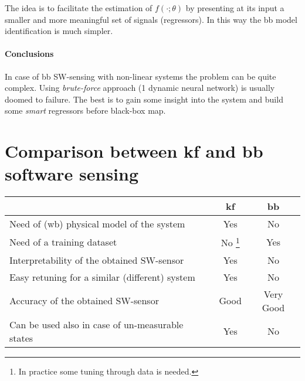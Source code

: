 The idea is to facilitate the estimation of $f(\cdot; \theta)$ by presenting at its input a smaller and more meaningful set of signals (regressors). In this way the \gls{bb} model identification is much simpler.

\paragraph{Conclusions} In case of \gls{bb} SW-sensing with non-linear systems the problem can be quite complex.
Using \emph{brute-force} approach (1 dynamic neural network) is usually doomed to failure.
The best is to gain some insight into the system and build some \emph{smart} regressors before black-box map.

\section{Comparison between \gls{kf} and \gls{bb} software sensing}

\begin{table}[htpb]
    \centering
    \bgroup
    \def\arraystretch{1.5}
    \begin{tabular}{l|c|c}
        & \textbf{\gls{kf}} & \textbf{\gls{bb}} \\
        \hline\hline 
        Need of (\gls{wb}) physical model of the system & \color{red} Yes & \color{green} No \\ \hline 
        Need of a training dataset & \color{green} No {\color{black} \footnote{In practice some tuning through data is needed.}} & \color{red} Yes \\ \hline 
        Interpretability of the obtained SW-sensor & \color{green} Yes & \color{red} No \\ \hline 
        Easy retuning for a similar (different) system & \color{green} Yes & \color{red} No \\ \hline 
        Accuracy of the obtained SW-sensor & \color{green} Good & \color{green} Very Good \\ \hline 
        Can be used also in case of un-measurable states & \color{green} Yes & \color{red} No \\ \hline\hline 
    \end{tabular}
    \egroup
\end{table}
\FloatBarrier

